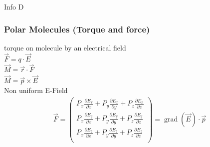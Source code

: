 \documentclass[a4paper]{scrartcl}
\begin{document}
Info D\\

\subsubsection{Polar Molecules (Torque and force)}

torque on molecule by an electrical field\\

$ \vec{F}=q\cdot\vec{E}$\\

$ \vec{M}=\vec{r}\cdot\vec{F}$\\

$ \vec{M}=\vec{p}\times\vec{E}$\\

Non uniform E-Field\\

\begin{align}
\vec F = \begin{pmatrix}
P_x \frac{\partial E_x}{\partial x} + P_y \frac{\partial E_x}{\partial y} + P_z
\frac{\partial E_x}{\partial z}\\
P_x \frac{\partial E_y}{\partial x} + P_y \frac{\partial E_y}{\partial y} + P_z
\frac{\partial E_y}{\partial z}\\
P_x \frac{\partial E_z}{\partial x} + P_y \frac{\partial E_z}{\partial y} + P_z
\frac{\partial E_z}{\partial z}\\
\end{pmatrix}
= \operatorname{grad} (\vec E) \cdot \vec p
\end{align}
\end{document}
